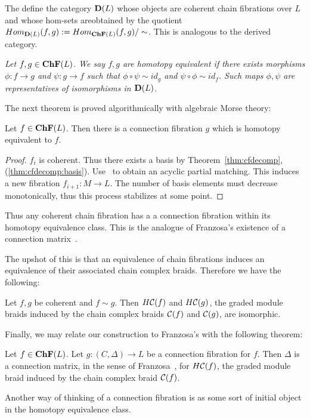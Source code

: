 The define the category ${\bf D}(L)$ whose objects are coherent chain fibrations over $L$ and whose hom-sets areobtained by the quotient $Hom_{{\bf D}(L)}(f,g) := Hom_{{\bf ChF}(L)}(f,g)/\sim$.  This is analogous to the derived category.

\begin{defn}
{\em
Let $f,g\in {\bf ChF}(L)$.  We say $f,g$ are {\em homotopy equivalent} if there exists morphisms $\phi:f\to g$ and $\psi:g\to f$ such that $\phi\circ \psi\sim id_g$ and $\psi\circ \phi \sim id_f$. Such maps $\phi,\psi$ are representatives of isomorphisms in ${\bf D}(L)$.
}
\end{defn}

The next theorem is proved algorithmically with algebraic Morse theory:


\begin{thm}\label{thm:exist}
Let $f\in {\bf ChF}(L)$.  Then there is a connection fibration $g$ which is homotopy equivalent to $f$.
\end{thm}
\begin{proof}
$f_i$ is coherent.  Thus there exists a basis by Theorem~\ref{thm:cfdecomp}, (\ref{thm:cfdecomp:basis}).  Use~\cite[Algorithm 3.6]{focm} to obtain an acyclic partial matching.  This induces a new fibration $f_{i+1}:M\to L$.  The number of basis elements must decrease monotonically, thus this process stabilizes at some point.

\end{proof}


\begin{rem}
Thus any coherent chain fibration has a a connection fibration within its homotopy equivalence class.  This is the analogue of Franzosa's existence of a connection matrix~\cite{fran}.
\end{rem}


The upshot of this is that an equivalence of chain fibrations induces an equivalence of their associated chain complex braids.  Therefore we have the following:

\begin{prop}
Let $f,g$ be coherent and $f\sim g$. Then $H{\mathcal C}(f)$ and $H{\mathcal C}(g)$, the graded module braids induced by the chain complex braids ${\mathcal C}(f)$ and ${\mathcal C}(g)$, are isomorphic.
\end{prop}

Finally, we may relate our construction to Franzosa's with the following theorem:

\begin{thm}\label{thm:cfcm}
Let $f\in {\bf ChF}(L)$.  Let $g:(C,\Delta)\to L$ be a connection fibration for $f$.  Then $\Delta$ is a connection matrix, in the sense of Franzosa~\cite[Definition 3.6]{fran}, for $H{\mathcal C}(f)$, the graded module braid induced by the chain complex braid ${\mathcal C}(f)$.
\end{thm}


Another way of thinking of a connection fibration is as some sort of initial object in the homotopy equivalence class.


